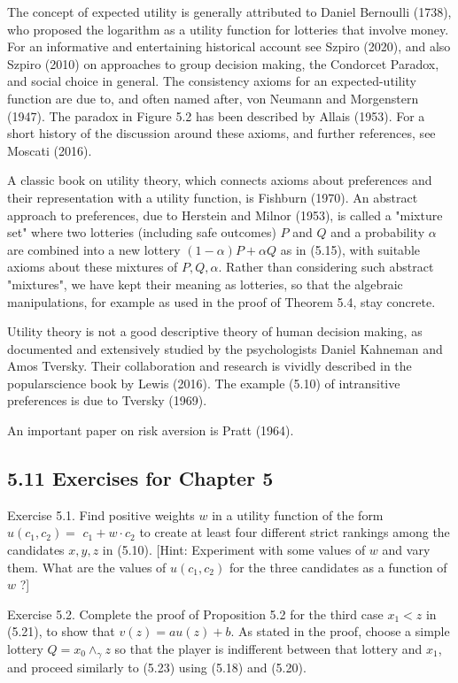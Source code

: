 \documentclass[12pt]{article}
\begin{document}
The concept of expected utility is generally attributed to Daniel Bernoulli (1738), who proposed the logarithm as a utility function for lotteries that involve money. For an informative and entertaining historical account see Szpiro (2020), and also Szpiro (2010) on approaches to group decision making, the Condorcet Paradox, and social choice in general. The consistency axioms for an expected-utility function are due to, and often named after, von Neumann and Morgenstern (1947). The paradox in Figure 5.2 has been described by Allais (1953). For a short history of the discussion around these axioms, and further references, see Moscati (2016).

A classic book on utility theory, which connects axioms about preferences and their representation with a utility function, is Fishburn (1970). An abstract approach to preferences, due to Herstein and Milnor (1953), is called a "mixture set" where two lotteries (including safe outcomes) $P$ and $Q$ and a probability $\alpha$ are combined into a new lottery $(1-\alpha) P+\alpha Q$ as in (5.15), with suitable axioms about these mixtures of $P, Q, \alpha$. Rather than considering such abstract "mixtures", we have kept their meaning as lotteries, so that the algebraic manipulations, for example as used in the proof of Theorem 5.4, stay concrete.

Utility theory is not a good descriptive theory of human decision making, as documented and extensively studied by the psychologists Daniel Kahneman and Amos Tversky. Their collaboration and research is vividly described in the popularscience book by Lewis (2016). The example (5.10) of intransitive preferences is due to Tversky (1969).

An important paper on risk aversion is Pratt (1964).

\subsection*{5.11 Exercises for Chapter 5}
Exercise 5.1. Find positive weights $w$ in a utility function of the form $u\left(c_{1}, c_{2}\right)=$ $c_{1}+w \cdot c_{2}$ to create at least four different strict rankings among the candidates $x, y, z$ in (5.10). [Hint: Experiment with some values of $w$ and vary them. What are the values of $u\left(c_{1}, c_{2}\right)$ for the three candidates as a function of $w$ ?]

Exercise 5.2. Complete the proof of Proposition 5.2 for the third case $x_{1}<z$ in (5.21), to show that $v(z)=a u(z)+b$. As stated in the proof, choose a simple lottery $Q=x_{0} \wedge_{\gamma} z$ so that the player is indifferent between that lottery and $x_{1}$, and proceed similarly to (5.23) using (5.18) and (5.20).
\end{document}
